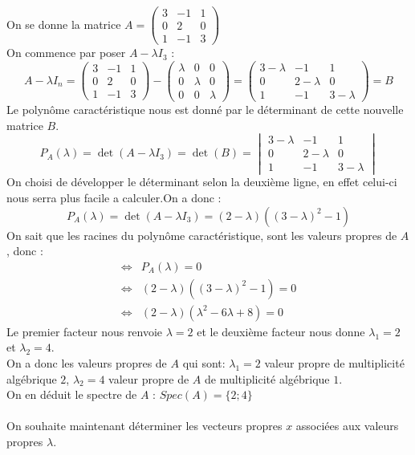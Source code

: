 \begin{ex}
On se donne la matrice $A=\begin{pmatrix}3&-1&1\\0&2&0\\1&-1&3\end{pmatrix}$\\
On commence par poser $A-\lambda I_3$ :
$$A-\lambda I_n = \begin{pmatrix}3&-1&1\\0&2&0\\1&-1&3\end{pmatrix}-\begin{pmatrix}\lambda&0&0\\0&\lambda&0\\0&0&\lambda\end{pmatrix}=\begin{pmatrix}3-\lambda&-1&1\\0&2-\lambda&0\\1&-1&3-\lambda\end{pmatrix}=B$$
Le polynôme caractéristique nous est donné par le déterminant de cette nouvelle matrice $B$.
$$P_A(\lambda)=\det(A-\lambda I_3)=\det(B)=\begin{vmatrix}3-\lambda&-1&1\\0&2-\lambda&0\\1&-1&3-\lambda\end{vmatrix}$$
On choisi de développer le déterminant selon la deuxième ligne, en effet celui-ci nous serra plus facile a calculer.On a donc :
$$P_A(\lambda)=\det(A-\lambda I_3)=(2-\lambda)((3-\lambda)^2-1)$$
On sait que les racines du polynôme caractéristique, sont les valeurs propres de $A$, donc :
\begin{align*}
    \Leftrightarrow & P_A(\lambda) = 0\\
    \Leftrightarrow & (2-\lambda)((3-\lambda)^2-1) = 0\\
    \Leftrightarrow & (2-\lambda)(\lambda^2-6\lambda+8) = 0
\end{align*}
Le premier facteur nous renvoie $\lambda = 2$ et le deuxième facteur nous donne $\lambda_1=2$ et $\lambda_2=4$.\\
On a donc les valeurs propres de $A$ qui sont: $\lambda_1 =2$ valeur propre de multiplicité algébrique $2$, $\lambda_2=4$ valeur propre de $A$ de multiplicité algébrique $1$.\\
On en déduit le spectre de $A$ : $Spec(A)=\{2;4\}$
\\
\\
On souhaite maintenant déterminer les vecteurs propres $x$ associées aux valeurs propres $\lambda$.\\

\end{ex}
